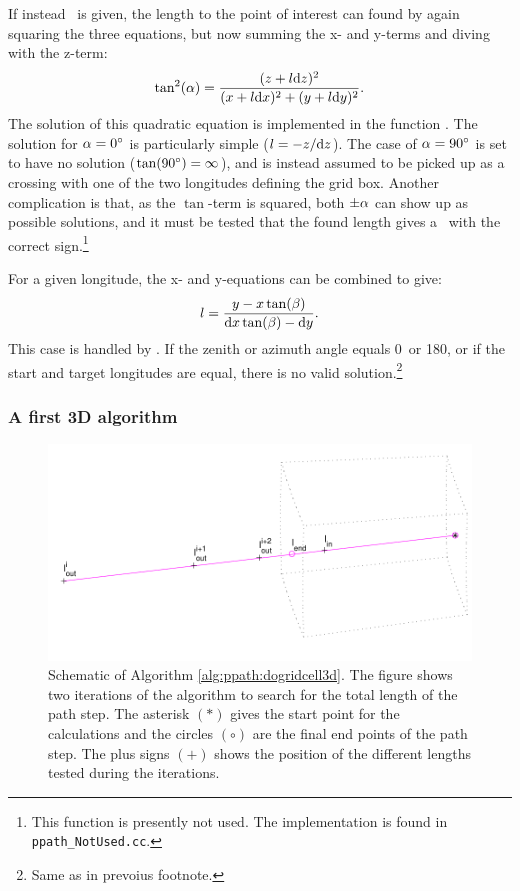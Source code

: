 If instead \Lat\ is given, the length to the point of interest can found by
again squaring the three equations, but now summing the x- and y-terms
and diving with the z-term:
\begin{equation}
  \tan^2(\alpha) = \frac{(z+l\mathrm{d} z)^2}{(x+l\mathrm{d} x)^2+(y+l\mathrm{d} y)^2}.
\end{equation}
The solution of this quadratic equation is implemented in the function
. The solution for $\alpha=0^\circ$ is particularly
simple ($l=-z/\mathrm{d} z$). The case of $\alpha=90^\circ$ is set to have no
solution ($\tan(90^\circ)=\infty$), and is instead assumed to be picked up as
a crossing with one of the two longitudes defining the grid box. Another
complication is that, as the $\tan$-term is squared, both $\pm\alpha$ can show up
as possible solutions, and it must be tested that the found length gives a
\Lat\ with the correct sign.\footnote{This function is presently not used. The
  implementation is found in \texttt{ppath\_NotUsed.cc}.}

For a given longitude, the x- and y-equations can be combined to give:
\begin{equation}
  l = \frac{y-x\tan(\beta)}{\mathrm{d} x\tan(\beta)-\mathrm{d} y}.
\end{equation}
This case is handled by . If the zenith or azimuth
angle equals 0\degree\ or 180\degree, or if the start and target longitudes are
equal, there is no valid solution.\footnote{Same as in prevoius footnote.}



\subsubsection{A first 3D algorithm}
\label{sec:ppath:3dgeom}

\begin{figure}
 \begin{center}
  \includegraphics*[width=0.80\hsize]{ppath_3Dsearch}
  \caption{Schematic of Algorithm \ref{alg:ppath:dogridcell3d}. The
    figure shows two iterations of the algorithm to search for the
    total length of the path step. The asterisk $(\ast)$ gives the
    start point for the calculations and the circles $(\circ)$ are the
    final end points of the path step. The plus signs $(+)$ shows the
    position of the different lengths tested during the iterations.}
  \label{fig:ppath:3Dsearch}  
 \end{center}
\end{figure}

